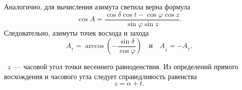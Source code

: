 Аналогично, для вычисления азимута светила верна формула
\begin{equation}
\cos A=\frac{\cos\delta\cos t-\cos\varphi\cos z}{\sin\varphi\sin z}.
\end{equation}
Следовательно, азимуты точек восхода и захода
\begin{equation}
	A_\uparrow = \arccos \left(-\dfrac{\sin\delta}{\cos \varphi} \right)\quad\text{и}\quad A_\downarrow = - A_\uparrow.
\end{equation}

~$z$~--- часовой угол точки весеннего равноденствия. Из определений прямого восхождения и часового угла следует справедливость равенства\begin{equation}
z = \alpha + t.
\end{equation}